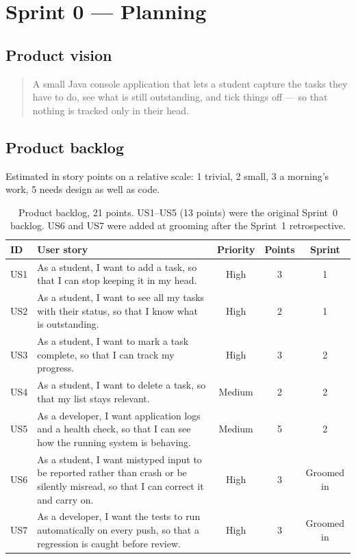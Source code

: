 \documentclass[11pt,a4paper]{article}
\begin{document}
\section{Sprint 0 --- Planning}

\subsection{Product vision}

\begin{quote}
A small Java console application that lets a student capture the tasks they have
to do, see what is still outstanding, and tick things off --- so that nothing is
tracked only in their head.
\end{quote}

\subsection{Product backlog}

Estimated in story points on a relative scale: 1 trivial, 2 small, 3 a
morning's work, 5 needs design as well as code.

\begin{table}[h]
\centering
\small
\begin{tabularx}{\textwidth}{@{}l X c c c@{}}
\toprule
\textbf{ID} & \textbf{User story} & \textbf{Priority} & \textbf{Points} & \textbf{Sprint} \\
\midrule
US1 & As a student, I want to add a task, so that I can stop keeping it in my head. & High & 3 & 1 \\
US2 & As a student, I want to see all my tasks with their status, so that I know what is outstanding. & High & 2 & 1 \\
US3 & As a student, I want to mark a task complete, so that I can track my progress. & High & 3 & 2 \\
US4 & As a student, I want to delete a task, so that my list stays relevant. & Medium & 2 & 2 \\
US5 & As a developer, I want application logs and a health check, so that I can see how the running system is behaving. & Medium & 5 & 2 \\
\midrule
US6 & As a student, I want mistyped input to be reported rather than crash or be silently misread, so that I can correct it and carry on. & High & 3 & Groomed in \\
US7 & As a developer, I want the tests to run automatically on every push, so that a regression is caught before review. & High & 3 & Groomed in \\
\bottomrule
\end{tabularx}
\caption{Product backlog, 21 points. US1--US5 (13 points) were the original
Sprint~0 backlog. US6 and US7 were added at grooming after the Sprint~1
retrospective.}
\end{table}
\end{document}
